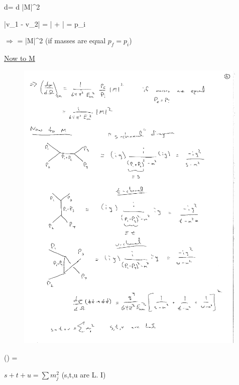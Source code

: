 {\be
d\sigma =  d\Omega {} |M|^2
\ee

\be
|v_1 - v_2| = \left|   +  \right| = p_i 
\ee


$\Rightarrow$
\be
{} =    |M|^2
\ee
(if masses are equal $p_f = p_i$)

\clearpage
\underline{Now to M}

\begin{figure}[h]
\centering
\includegraphics[width=0.99\textwidth]{./STUDiagrams.pdf}
\end{figure}

\be
{}(\phi\phi\rightarrow\phi\phi) =  
\ee


$s+t+u = \sum m_j^2$  (s,t,u are L. I)

\clearpage

}
